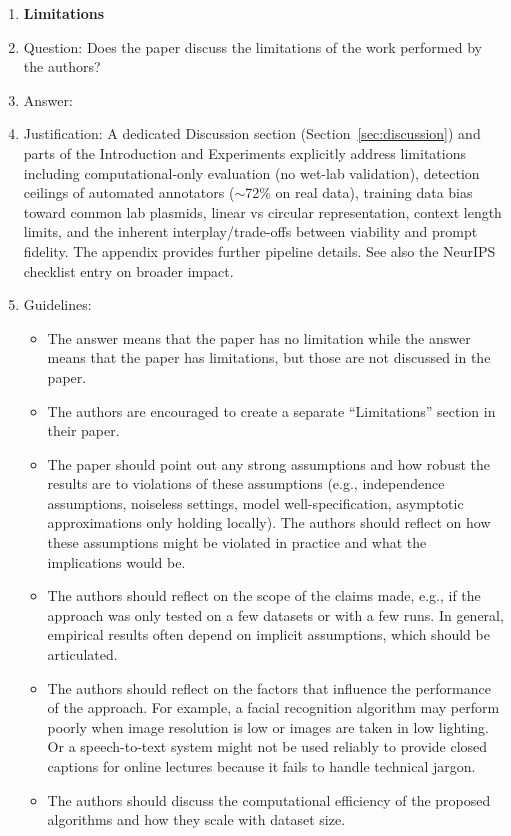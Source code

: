\begin{enumerate}
\item {\bf Limitations}
    \item[] Question: Does the paper discuss the limitations of the work performed by the authors?
    \item[] Answer: \answerYes{}
    \item[] Justification: A dedicated Discussion section (Section~\ref{sec:discussion}) and parts of the Introduction and Experiments explicitly address limitations including computational-only evaluation (no wet-lab validation), detection ceilings of automated annotators ($\sim$72\% on real data), training data bias toward common lab plasmids, linear vs circular representation, context length limits, and the inherent interplay/trade-offs between viability and prompt fidelity. The appendix provides further pipeline details. See also the NeurIPS checklist entry on broader impact.
    \item[] Guidelines:
    \begin{itemize}
        \item The answer \answerNA{} means that the paper has no limitation while the answer \answerNo{} means that the paper has limitations, but those are not discussed in the paper. 
        \item The authors are encouraged to create a separate ``Limitations'' section in their paper.
        \item The paper should point out any strong assumptions and how robust the results are to violations of these assumptions (e.g., independence assumptions, noiseless settings, model well-specification, asymptotic approximations only holding locally). The authors should reflect on how these assumptions might be violated in practice and what the implications would be.
        \item The authors should reflect on the scope of the claims made, e.g., if the approach was only tested on a few datasets or with a few runs. In general, empirical results often depend on implicit assumptions, which should be articulated.
        \item The authors should reflect on the factors that influence the performance of the approach. For example, a facial recognition algorithm may perform poorly when image resolution is low or images are taken in low lighting. Or a speech-to-text system might not be used reliably to provide closed captions for online lectures because it fails to handle technical jargon.
        \item The authors should discuss the computational efficiency of the proposed algorithms and how they scale with dataset size.

\end{itemize}
\end{enumerate}
